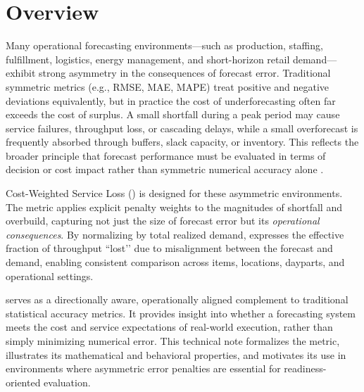 \section{Overview}

Many operational forecasting environments—such as production, staffing,
fulfillment, logistics, energy management, and short-horizon retail demand—
exhibit strong asymmetry in the consequences of forecast error. Traditional
symmetric metrics (e.g., RMSE, MAE, MAPE) treat positive and negative deviations
equivalently, but in practice the cost of underforecasting often far exceeds the
cost of surplus. A small shortfall during a peak period may cause service
failures, throughput loss, or cascading delays, while a small overforecast is
frequently absorbed through buffers, slack capacity, or inventory. This reflects
the broader principle that forecast performance must be evaluated in terms of
decision or cost impact rather than symmetric numerical accuracy alone
\citep{armstrong2001}.

Cost-Weighted Service Loss (\CWSL) is designed for these asymmetric environments.
The metric applies explicit penalty weights to the magnitudes of shortfall and
overbuild, capturing not just the size of forecast error but its \emph{operational
consequences}. By normalizing by total realized demand, \CWSL{} expresses the
effective fraction of throughput “lost’’ due to misalignment between the forecast
and demand, enabling consistent comparison across items, locations, dayparts,
and operational settings.

\CWSL{} serves as a directionally aware, operationally aligned complement to
traditional statistical accuracy metrics. It provides insight into whether a
forecasting system meets the cost and service expectations of real-world
execution, rather than simply minimizing numerical error. This technical note
formalizes the \CWSL{} metric, illustrates its mathematical and behavioral
properties, and motivates its use in environments where asymmetric error
penalties are essential for readiness-oriented evaluation.
